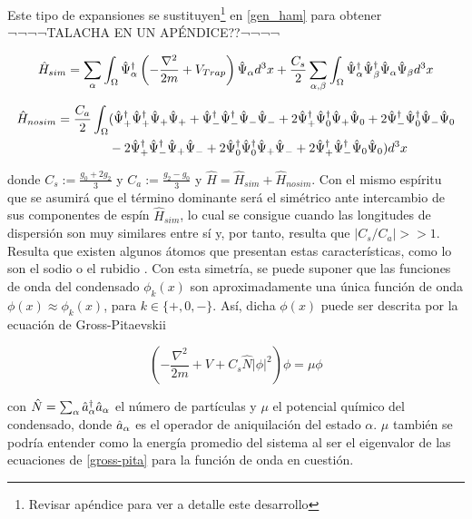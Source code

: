 Este tipo de expansiones se sustituyen\footnote{Revisar apéndice \cite{talacha} para ver a detalle este desarrollo} en \ref{gen_ham} para obtener ¬¬¬¬TALACHA EN UN APÉNDICE??¬¬¬¬

\begin{equation}
\hat{H}_{sim} = \sum_{\alpha} \int_{\Omega} \hat{\Psi}^{\dagger}_\alpha \left( -\frac{\nabla^2}{2m} + V_{Trap} \right) \hat{\Psi}_{\alpha} d^3x + \frac{C_s}{2}\sum_{\alpha,\beta}\int_{\Omega} \hat{\Psi}^{\dagger}_\alpha\hat{\Psi}^{\dagger}_\beta\hat{\Psi}_{\alpha}\hat{\Psi}_{\beta} d^3x
\label{h_sim}
\end{equation}

\begin{equation}
\begin{split}
\hat{H}_{nosim}  = \frac{C_a}{2} \int_{\Omega} & ( \hat{\Psi}^{\dagger}_+\hat{\Psi}^{\dagger}_+\hat{\Psi}_{+}\hat{\Psi}_{+} + 
\hat{\Psi}^{\dagger}_-\hat{\Psi}^{\dagger}_-\hat{\Psi}_{-}\hat{\Psi}_{-} + 2\hat{\Psi}^{\dagger}_+\hat{\Psi}^{\dagger}_0\hat{\Psi}_{+}\hat{\Psi}_{0} + 2\hat{\Psi}^{\dagger}_-\hat{\Psi}^{\dagger}_0\hat{\Psi}_{-}\hat{\Psi}_{0} \\
& - 2\hat{\Psi}^{\dagger}_+\hat{\Psi}^{\dagger}_-\hat{\Psi}_{+}\hat{\Psi}_{-} + 2\hat{\Psi}^{\dagger}_0\hat{\Psi}^{\dagger}_0\hat{\Psi}_{+}\hat{\Psi}_{-} + 2\hat{\Psi}^{\dagger}_+\hat{\Psi}^{\dagger}_-\hat{\Psi}_{0}\hat{\Psi}_{0} ) d^3x
\end{split}
\label{h_nosim}
\end{equation}

donde $C_s := \frac{g_0 + 2g_2}{3}$ y $C_a := \frac{g_2 - g_0}{3}$ y $\hat{H} = \hat{H}_{sim} + \hat{H}_{nosim}$. Con el mismo espíritu que \cite{law98} se asumirá que el término dominante será el simétrico ante intercambio de sus componentes de espín $\hat{H}_{sim}$, lo cual se consigue cuando las longitudes de dispersión son muy similares entre sí y, por tanto, resulta que $|C_s/C_a| >> 1$. Resulta que existen algunos átomos que presentan estas características, como lo son el sodio o el rubidio \cite{sim_scatt_length}. Con esta simetría, se puede suponer que las funciones de onda del condensado $\phi_k(x)$ son aproximadamente una única función de onda $\phi(x) \approx \phi_k(x)$, para $k \in \{ +,0,- \}$. Así, dicha $\phi(x)$ puede ser descrita por la ecuación de Gross-Pitaevskii

\begin{equation}
\left(-\frac{\nabla^2}{2m} + V + C_s\hat{N}|\phi|^2 \right)\phi = \mu \phi
\label{gross-pita}
\end{equation}

con $\hat{N}= \sum_\alpha \hat{a}_{\alpha}^{\dagger} \hat{a}_{\alpha}$ el número de partículas y $\mu$ el potencial químico del condensado, donde $\hat{a}_{\alpha}$ es el operador de aniquilación del estado $\alpha$. $\mu$ también se podría entender como la energía promedio del sistema al ser el eigenvalor de las ecuaciones de \ref{gross-pita} para la función de onda en cuestión. 


